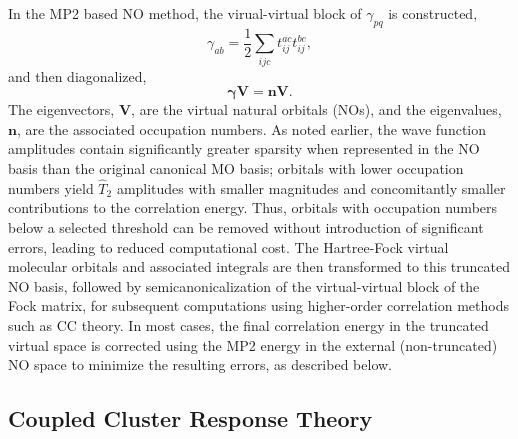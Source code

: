 \documentclass[11pt,article]{achemso}
\begin{document}
In the MP2 based NO method, the virual-virtual block of $\gamma_{pq}$
is constructed,
\begin{equation}
\gamma_{ab} = \frac{1}{2}\sum_{ijc} t^{ac}_{ij}t^{bc}_{ij},
\label{Eq:dens}
\end{equation}
and then diagonalized,
\begin{equation}
\bm{\gamma} \bm{V} = \bm{n} \bm{V}.
\end{equation}
The eigenvectors, $\bm{V}$, are the virtual natural orbitals (NOs), and the
eigenvalues, $\bm{n}$, are the associated occupation numbers.  As noted
earlier, the wave function amplitudes contain significantly greater sparsity
when represented in the NO basis than the original canonical MO basis;
orbitals with lower occupation numbers yield $\hat{T}_2$ amplitudes with
smaller magnitudes and concomitantly smaller contributions to the correlation
energy.  Thus, orbitals with occupation numbers below a selected threshold can
be removed without introduction of significant errors, leading to reduced
computational cost.  The Hartree-Fock virtual molecular orbitals and
associated integrals are then transformed to this truncated NO basis, followed
by semicanonicalization of the virtual-virtual block of the Fock matrix, for
subsequent computations using higher-order correlation methods such as CC
theory.  In most cases, the final correlation energy in the truncated virtual
space is corrected using the MP2 energy in the external (non-truncated) NO
space to minimize the resulting errors, as described below.

\subsection{Coupled Cluster Response Theory}
\end{document}
